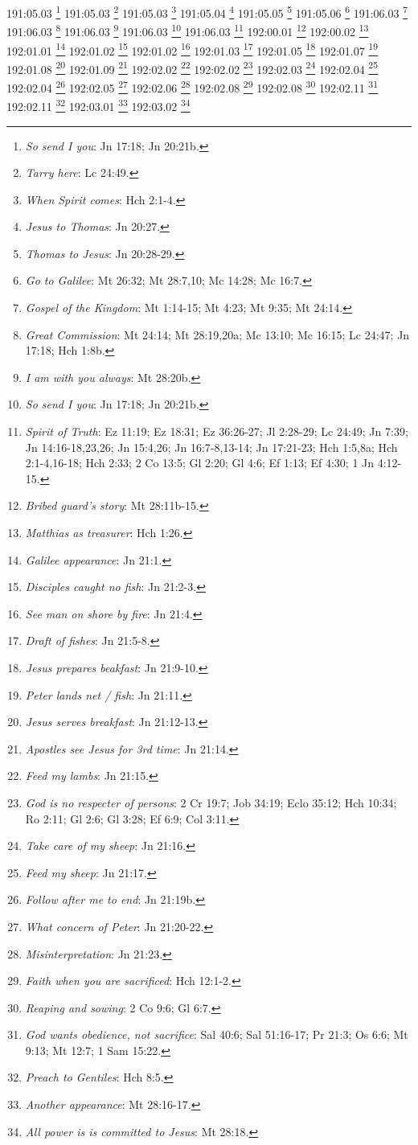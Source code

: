 191:05.03 \footnote{\textit{So send I you}: Jn 17:18; Jn 20:21b.}
191:05.03 \footnote{\textit{Tarry here}: Lc 24:49.}
191:05.03 \footnote{\textit{When Spirit comes}: Hch 2:1-4.}
191:05.04 \footnote{\textit{Jesus to Thomas}: Jn 20:27.}
191:05.05 \footnote{\textit{Thomas to Jesus}: Jn 20:28-29.}
191:05.06 \footnote{\textit{Go to Galilee}: Mt 26:32; Mt 28:7,10; Mc 14:28; Mc 16:7.}
191:06.03 \footnote{\textit{Gospel of the Kingdom}: Mt 1:14-15; Mt 4:23; Mt 9:35; Mt 24:14.}
191:06.03 \footnote{\textit{Great Commission}: Mt 24:14; Mt 28:19,20a; Mc 13:10; Mc 16:15; Lc 24:47; Jn 17:18; Hch 1:8b.}
191:06.03 \footnote{\textit{I am with you always}: Mt 28:20b.}
191:06.03 \footnote{\textit{So send I you}: Jn 17:18; Jn 20:21b.}
191:06.03 \footnote{\textit{Spirit of Truth}: Ez 11:19; Ez 18:31; Ez 36:26-27; Jl 2:28-29; Lc 24:49; Jn 7:39; Jn 14:16-18,23,26; Jn 15:4,26; Jn 16:7-8,13-14; Jn 17:21-23; Hch 1:5,8a; Hch 2:1-4,16-18; Hch 2:33; 2 Co 13:5; Gl 2:20; Gl 4:6; Ef 1:13; Ef 4:30; 1 Jn 4:12-15.}
192:00.01 \footnote{\textit{Bribed guard's story}: Mt 28:11b-15.}
192:00.02 \footnote{\textit{Matthias as treasurer}: Hch 1:26.}
192:01.01 \footnote{\textit{Galilee appearance}: Jn 21:1.}
192:01.02 \footnote{\textit{Disciples caught no fish}: Jn 21:2-3.}
192:01.02 \footnote{\textit{See man on shore by fire}: Jn 21:4.}
192:01.03 \footnote{\textit{Draft of fishes}: Jn 21:5-8.}
192:01.05 \footnote{\textit{Jesus prepares beakfast}: Jn 21:9-10.}
192:01.07 \footnote{\textit{Peter lands net / fish}: Jn 21:11.}
192:01.08 \footnote{\textit{Jesus serves breakfast}: Jn 21:12-13.}
192:01.09 \footnote{\textit{Apostles see Jesus for 3rd time}: Jn 21:14.}
192:02.02 \footnote{\textit{Feed my lambs}: Jn 21:15.}
192:02.02 \footnote{\textit{God is no respecter of persons}: 2 Cr 19:7; Job 34:19; Eclo 35:12; Hch 10:34; Ro 2:11; Gl 2:6; Gl 3:28; Ef 6:9; Col 3:11.}
192:02.03 \footnote{\textit{Take care of my sheep}: Jn 21:16.}
192:02.04 \footnote{\textit{Feed my sheep}: Jn 21:17.}
192:02.04 \footnote{\textit{Follow after me to end}: Jn 21:19b.}
192:02.05 \footnote{\textit{What concern of Peter}: Jn 21:20-22.}
192:02.06 \footnote{\textit{Misinterpretation}: Jn 21:23.}
192:02.08 \footnote{\textit{Faith when you are sacrificed}: Hch 12:1-2.}
192:02.08 \footnote{\textit{Reaping and sowing}: 2 Co 9:6; Gl 6:7.}
192:02.11 \footnote{\textit{God wants obedience, not sacrifice}: Sal 40:6; Sal 51:16-17; Pr 21:3; Os 6:6; Mt 9:13; Mt 12:7; 1 Sam 15:22.}
192:02.11 \footnote{\textit{Preach to Gentiles}: Hch 8:5.}
192:03.01 \footnote{\textit{Another appearance}: Mt 28:16-17.}
192:03.02 \footnote{\textit{All power is is committed to Jesus}: Mt 28:18.}
